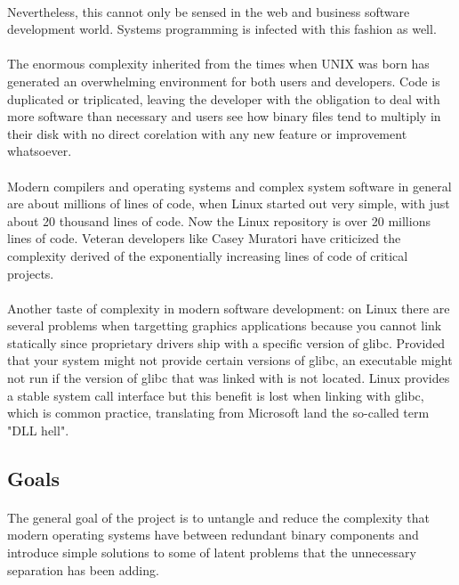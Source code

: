 \documentclass[12pt]{article}
\begin{document}
	\paragraph{}Nevertheless, this cannot only be sensed in the web and business software development world. Systems programming is infected with this fashion as well.
	\paragraph{} The enormous complexity inherited from the times when UNIX was born has generated an overwhelming environment for both users and developers. Code is duplicated or triplicated, leaving the developer with the obligation to deal with more software than necessary and users see how binary files tend to multiply in their disk with no direct corelation with any new feature or improvement whatsoever.
	\paragraph{}Modern compilers and operating systems and complex system software in general are about millions of lines of code, when Linux started out very simple, with just about 20 thousand lines of code. Now the Linux repository is over 20 millions lines of code. Veteran developers like Casey Muratori have criticized the complexity derived of the exponentially increasing lines of code of critical projects\cite{thirty-million}.
	\paragraph{}Another taste of complexity in modern software development: on Linux there are several problems when targetting graphics applications because you cannot link statically since proprietary drivers ship with a specific version of \gls{glibc}. Provided that your system might not provide certain versions of \gls{glibc}, an executable might not run if the version of glibc that was linked with is not located. Linux provides a stable system call interface but this benefit is lost when linking with \gls{glibc}, which is common practice, translating from Microsoft land the so-called term "\acrshort{DLL} hell".
	\subsection{Goals}
	\paragraph{}The general goal of the project is to untangle and reduce the complexity that modern operating systems have between redundant binary components and introduce simple solutions to some of latent problems that the unnecessary separation has been adding.	
\end{document}
